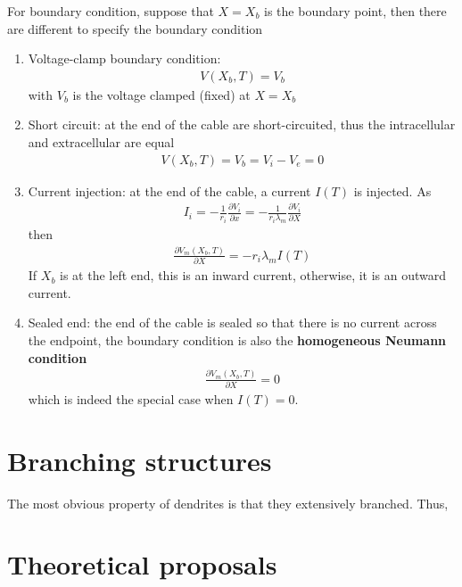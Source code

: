 For boundary condition, suppose that $X=X_b$ is the boundary point,
then there are different to specify the boundary condition
\begin{enumerate}
\item Voltage-clamp boundary condition: 
  \begin{eqnarray}
    \label{eq:441}
    V(X_b,T) = V_b
  \end{eqnarray}
with $V_b$ is the voltage clamped (fixed) at $X=X_b$

\item Short circuit: at the end of the cable are short-circuited, thus
  the intracellular and extracellular are equal
  \begin{eqnarray}
    \label{eq:442}
    V(X_b,T) = V_b = V_i-V_e = 0
  \end{eqnarray}

\item Current injection: at the end of the cable, a current $I(T)$ is
  injected. As
  \begin{eqnarray}
    \label{eq:443}
    I_i = -\frac{1}{r_i}\frac{\partial V_i}{\partial x} =  -\frac{1}{r_i\lambda_m}\frac{\partial V_i}{\partial X}
  \end{eqnarray}
then
\begin{eqnarray}
  \label{eq:444}
  \frac{\partial V_m(X_b,T)}{\partial X} = -r_i\lambda_mI(T)
\end{eqnarray}
If $X_b$ is at the left end, this is an inward current, otherwise, it
is an outward current.

\item Sealed end: the end of the cable is sealed so that there is no
  current across the endpoint, the boundary condition is also the {\bf
    homogeneous Neumann condition}
  \begin{eqnarray}
    \label{eq:445}
    \frac{\partial V_m(X_b,T)}{\partial X} = 0
  \end{eqnarray}
which is indeed the special case when $I(T)=0$.
\end{enumerate}

\section{Branching structures}
\label{sec:branching-structures}

The most obvious property of dendrites is that they extensively
branched. Thus, 

\section{Theoretical proposals}
\label{sec:theor-prop}

